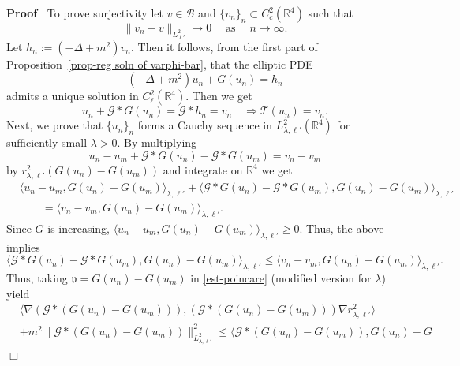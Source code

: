 \documentclass{article}
\newcommand{\assign}{:=}
\newcommand{\tmop}[1]{\ensuremath{\operatorname{#1}}}
\newenvironment{proof}{\noindent\textbf{Proof\ }}{\hspace*{\fill}$\Box$\medskip}
\begin{document}
\begin{proof}
  To prove surjectivity let $v \in \mathcal{B}$ and $\{ v_n \}_n \subset
  C_c^2 (\mathbb{R}^4)$ such that
  \[ 
       \| v_n - v \|_{L^2_{\ell'}} \rightarrow 0 \quad \tmop{as} \quad n
       \rightarrow \infty .
      \]
  Let $h_n \assign (- \Delta + m^2) v_n$. Then it follows, from the first part
  of Proposition~\ref{prop-reg soln of varphi-bar}, that the elliptic PDE
  \[ 
       (- \Delta + m^2) u_n + G (u_n) = h_n
      \]
  admits a unique solution in $C_{\ell}^2 (\mathbb{R}^4)$. Then we get
  \begin{equation}
      u_n +\mathcal{G} \ast G (u_n) =\mathcal{G} \ast h_n = v_n \quad \Rightarrow       \mathcal{T} (u_n) = v_n .
    \label{T-un-vn}
  \end{equation}
  Next, we prove that $\{ u_n \}_n$ forms a Cauchy sequence in $L_{\lambda,
  \ell'}^2 (\mathbb{R}^4)$ for sufficiently small $\lambda > 0$. By
  multiplying
  \begin{equation}
      u_n - u_m +\mathcal{G} \ast G (u_n) -\mathcal{G} \ast G (u_m) = v_n -   v_m \label{unvn}
  \end{equation}
  by $r_{\lambda, \ell'}^2 (G (u_n) - G (u_m))$ and integrate on $\mathbb{R}^4$ we get
  \begin{align*}
     & \langle u_n - u_m, G (u_n) - G (u_m) \rangle_{\lambda, \ell'} +
       \langle \mathcal{G} \ast G (u_n) -\mathcal{G} \ast G (u_m), G (u_n) - G
       (u_m) \rangle_{\lambda, \ell'}\\
       & \qquad =\langle v_n - v_m, G (u_n) - G (u_m) \rangle_{\lambda, \ell'} . 
  \end{align*}
  Since $G$ is increasing, $\langle u_n - u_m, G (u_n) - G (u_m)
  \rangle_{\lambda, \ell'} \geqslant 0$. Thus, the above implies
  \begin{equation}
      \langle \mathcal{G} \ast G (u_n) -\mathcal{G} \ast G (u_m), G (u_n) - G
      (u_m) \rangle_{\lambda, \ell'} \leqslant \langle v_n - v_m, G (u_n) - G
      (u_m) \rangle_{\lambda, \ell'} .
    \label{unvn-est1}
  \end{equation}
  Thus, taking $\mathfrak{v}= G (u_n) - G (u_m)$ in \eqref{est-poincare}
  (modified version for $\lambda$) yield
  \begin{align}
      & \langle \nabla (\mathcal{G} \ast (G (u_n) - G (u_m))), (\mathcal{G}
      \ast (G (u_n) - G (u_m))) \nabla r_{\lambda, \ell'}^2 \rangle\\
      & + m^2 \| \mathcal{G} \ast (G (u_n) - G (u_m)) \|_{L^2_{\lambda,
      \ell'}}^2 \leqslant  \langle \mathcal{G} \ast (G (u_n) - G (u_m)), G (u_n) - G

\end{align}
\end{proof}
\end{document}
